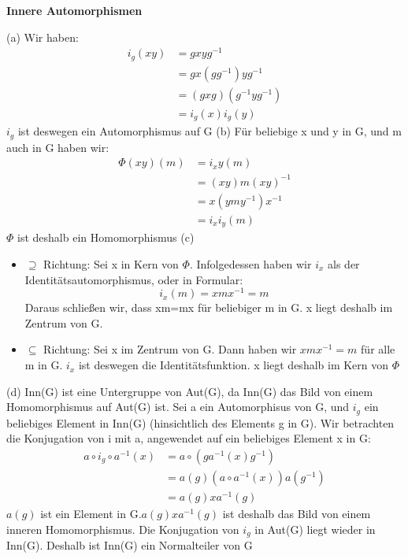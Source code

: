 \documentclass{homework}
\begin{document}
\begin{problem}
    \textbf{Innere Automorphismen}
\end{problem}

\begin{solution}
    (a) Wir haben:
    \begin{align*}
        i_g(xy) &= gxyg^{-1}  \tag*{(nach Definition)} \\
               &= gx(gg^{-1})yg^{-1} \\
               &= (gxg)(g^{-1}yg^{-1}) \\
               &= i_g(x)i_g(y)
     \end{align*}
$i_g$ ist deswegen ein Automorphismus auf G \newline
(b)
Für beliebige x und y in G, und m auch in G haben wir:
\begin{align*}
    \Phi(xy)(m) &= i_xy(m) \\
            &= (xy)m(xy)^{-1} \tag*{(nach Definition)} \\
            &= x(ymy^{-1})x^{-1} \\
            &= i_xi_y(m)
\end{align*}
$\Phi$ ist deshalb ein Homomorphismus \newline
(c)
\begin{itemize}
    \item $\supseteq$ Richtung: Sei x in Kern von $\Phi$. Infolgedessen haben wir $i_x$ als der Identitätsautomorphismus, oder in Formular:\[
        i_x(m) = xmx^{-1} = m \tag*{(für beliebiger m in G)}
    \]
    Daraus schließen wir, dass xm=mx für beliebiger m in G. x liegt deshalb im Zentrum von G.
    \item $\subseteq$ Richtung: Sei x im Zentrum von G. Dann haben wir $xmx^{-1} = m$ für alle m in G. $i_x$ ist deswegen die Identitätsfunktion. x liegt deshalb im Kern von $\Phi$
\end{itemize}
(d) Inn(G) ist eine Untergruppe von Aut(G), da Inn(G) das Bild von einem Homomorphismus auf Aut(G) ist. Sei a ein Automorphisus von G, und $i_g$ ein beliebiges Element in Inn(G) (hinsichtlich des Elements g in G). Wir betrachten die Konjugation von i mit a, angewendet auf ein beliebiges Element x in G:
\begin{align*}
    a \circ i_g \circ a^{-1} (x)&= a \circ (ga^{-1} (x)g^{-1}) \\
    &= a(g) (a \circ a^{-1} (x)) a(g^{-1}) \tag*{(Da a ist ein Automorphismus ist)} \\
    &= a(g)x a^{-1}(g)
\end{align*}
$a(g)$ ist ein Element in G.$a(g)x a^{-1}(g)$ ist deshalb das Bild von einem inneren Homomorphismus. Die Konjugation von $i_g$ in Aut(G) liegt wieder in Inn(G). Deshalb ist Inn(G) ein Normalteiler von G

\end{solution}
\end{document}
